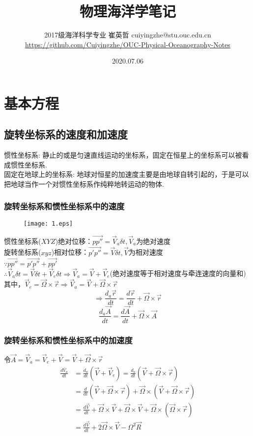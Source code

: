 \documentclass[a4paper,12pt]{article}
\title{\heiti 物理海洋学笔记}
\author{\small 2017级海洋科学专业 崔英哲 \quad cuiyingzhe@stu.ouc.edu.cn\\
 \small \url{https://github.com/Cuiyingzhe/OUC-Physical-Oceanography-Notes}}
\date{\small 2020.07.06}
\begin{document}
    \maketitle
    \renewcommand*\contentsname{}
	\tableofcontents
    \newpage
    \section{基本方程}
    \subsection{旋转坐标系的速度和加速度}
    \setlength{\parindent}{0pt}
    惯性坐标系:
    静止的或是匀速直线运动的坐标系，固定在恒星上的坐标系可以被看成惯性坐标系.\\
    固定在地球上的坐标系:
    地球对恒星的加速度主要是由地球自转引起的，于是可以把地球当作一个对惯性坐标系作纯粹地转运动的物体.
    \subsubsection{旋转坐标系和惯性坐标系中的速度}
    \begin{figure}[H]
		\centering\texttt{[image: 1.eps]}
		\caption*{}
    \end{figure}
    惯性坐标系($XYZ$)绝对位移：$\vec{pp''}=\vec{V}_a\delta t, \vec{V}_a$为绝对速度\\
    旋转坐标系($xyz$)相对位移：$\vec{p'p''}=\vec{V}\delta t, \vec{V}$为相对速度\\
    $\because \vec{pp''}=\vec{p'p''}+\vec{pp'}$ \\
    $\therefore\vec{V}_a\delta t=\vec{V}\delta t+\vec{V}_e\delta t\Rightarrow\vec{V}_a=\vec{V}+\vec{V}_e$(绝对速度等于相对速度与牵连速度的向量和)\\
    其中，$\vec{V}_e=\vec{\Omega}\times\vec{r}\Rightarrow\vec{V}_a=\vec{V}+\vec{\Omega}\times\vec{r}$
    \[
        \Rightarrow\frac{d_a\vec{r}}{dt}=\frac{d\vec{r}}{dt}+\vec{\Omega}\times\vec{r}
    \]
    \[
        \frac{d_a\vec{A}}{dt}=\frac{d\vec{A}}{dt}+\vec{\Omega}\times\vec{A}
    \]
    \subsubsection{旋转坐标系和惯性坐标系中的加速度}
    令$\vec{A}=\vec{V}_a=\vec{V}_e+\vec{V}=\vec{V}+\vec{\Omega}\times\vec{r}$
    \begin{equation*}
        \begin{aligned} \frac{d \bar{V}_{a}}{d t} &=\frac{d_{a}}{d t}\left(\vec{V}+\vec{V}_{e}\right)=\frac{d_{a}}{d t}(\vec{V}+\vec{\Omega} \times \vec{r}) \\ &=\frac{d}{d t}(\vec{V}+\vec{\Omega} \times \vec{r})+\vec{\Omega} \times(\vec{V}+\vec{\Omega} \times \vec{r}) \\ &=\frac{d \vec{V}}{d t}+\vec{\Omega} \times \vec{V}+\vec{\Omega} \times \vec{V}+\vec{\Omega} \times(\vec{\Omega} \times \vec{r}) \\ &=\frac{d \vec{V}}{d t}+2 \vec{\Omega} \times \vec{V}-\Omega^{2} \vec{R} \end{aligned}
    \end{equation*}
\end{document}
